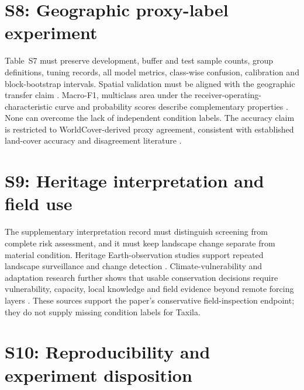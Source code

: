 



\section{S8: Geographic proxy-label experiment}

Table~S7 must preserve development, buffer and test sample counts, group definitions, tuning records, all model metrics, class-wise confusion, calibration and block-bootstrap intervals. Spatial validation must be aligned with the geographic transfer claim \citep{hijmans2012cv,meyer2018target,meyer2019selection,meyer2021aoa,roberts2017cv}. Macro-F1, multiclass area under the receiver-operating-characteristic curve and probability scores describe complementary properties \citep{saito2015precision,hand2001auc,gneiting2007scoring}. None can overcome the lack of independent condition labels. The accuracy claim is restricted to WorldCover-derived proxy agreement, consistent with established land-cover accuracy and disagreement literature \citep{congalton1991accuracy,foody2002accuracy,olofsson2014accuracy,pontius2011kappa}.



\section{S9: Heritage interpretation and field use}

The supplementary interpretation record must distinguish screening from complete risk assessment, and it must keep landscape change separate from material condition. Heritage Earth-observation studies support repeated landscape surveillance and change detection \citep{agapiou2017petabyte,agapiou2021dynamic,tapete2017sar}. Climate-vulnerability and adaptation research further shows that usable conservation decisions require vulnerability, capacity, local knowledge and field evidence beyond remote forcing layers \citep{sesana2020vulnerability,crowley2022risk,daly2022adaptation}. These sources support the paper's conservative field-inspection endpoint; they do not supply missing condition labels for Taxila.

\section{S10: Reproducibility and experiment disposition}

